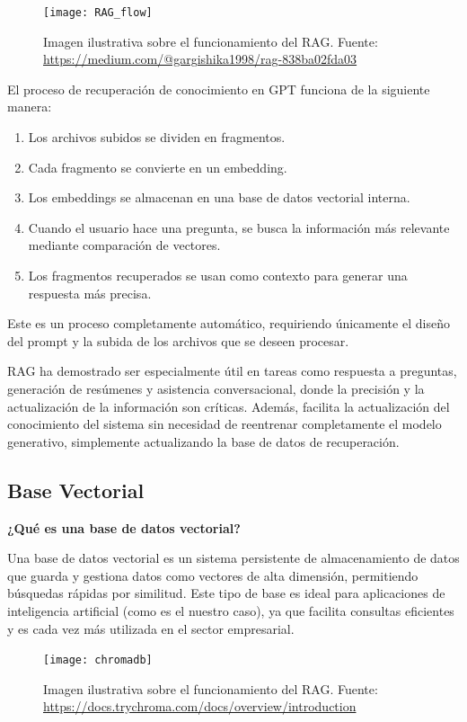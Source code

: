 \documentclass{article}
\begin{document}
\begin{figure}[h!]
\centering
\texttt{[image: RAG\_flow]}
\caption{Imagen ilustrativa sobre el funcionamiento del RAG. Fuente: \url{https://medium.com/@gargishika1998/rag-838ba02fda03}}
\label{fig:RAG_flow}
\end{figure}

El proceso de recuperación de conocimiento en GPT funciona de la siguiente manera:
\begin{enumerate}
    \item Los archivos subidos se dividen en fragmentos.
    \item Cada fragmento se convierte en un embedding.
    \item Los embeddings se almacenan en una base de datos vectorial interna.
    \item Cuando el usuario hace una pregunta, se busca la información más relevante mediante comparación de vectores.
    \item Los fragmentos recuperados se usan como contexto para generar una respuesta más precisa.
\end{enumerate}

Este es un proceso completamente automático, requiriendo únicamente el diseño del prompt y la subida de los archivos que se deseen procesar.

RAG ha demostrado ser especialmente útil en tareas como respuesta a preguntas, generación de resúmenes y asistencia conversacional, donde la precisión y la actualización de la información son críticas. Además, facilita la actualización del conocimiento del sistema sin necesidad de reentrenar completamente el modelo generativo, simplemente actualizando la base de datos de recuperación.

\cite{openai}

\subsection{Base Vectorial}
\textbf{¿Qué es una base de datos vectorial?} 

Una base de datos vectorial es un sistema persistente de almacenamiento de datos que guarda y gestiona datos como vectores de alta dimensión, permitiendo búsquedas rápidas por similitud. Este tipo de base es ideal para aplicaciones de inteligencia artificial (como es el nuestro caso), ya que facilita consultas eficientes y es cada vez más utilizada en el sector empresarial.

\begin{figure}[h!]
\centering
\texttt{[image: chromadb]}
\caption{Imagen ilustrativa sobre el funcionamiento del RAG. Fuente: \url{https://docs.trychroma.com/docs/overview/introduction}}
\label{fig:chromadb}
\end{figure}
\end{document}
